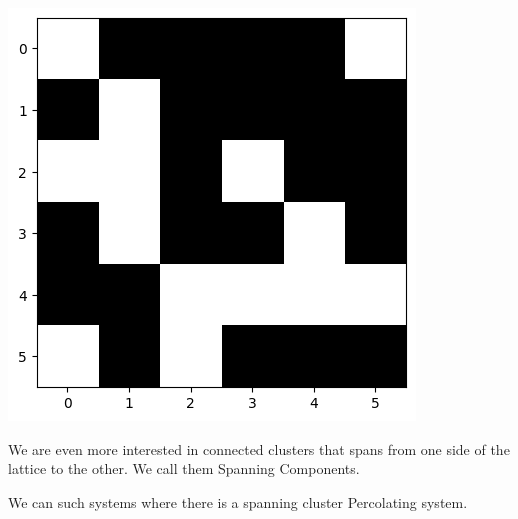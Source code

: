 \documentclass[compress]{beamer}
\newcommand{\imp}[1]{\textcolor{NordRed}{#1}}
\begin{document}
\begin{frame}
\begin{minipage}{.3\linewidth}
    \end{minipage}\hfill%
    \begin{minipage}{.3\linewidth}
        \includegraphics[width=\linewidth]{p3.png}
    \end{minipage}
\end{frame}

\begin{frame}
    
    We are even more interested in connected clusters that spans from one side of the
    lattice to the other. We call them \imp{Spanning Components}. 

    \vspace{12pt}

    We can such systems where there is a spanning cluster \imp{Percolating system}.

\end{frame}
\end{document}
